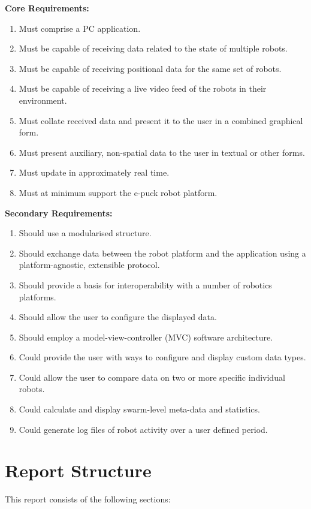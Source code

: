 \noindent\textbf{Core Requirements:}
\begin{enumerate}
	\item Must comprise a PC application.
	\item Must be capable of receiving data related to the state of multiple robots.
	\item Must be capable of receiving positional data for the same set of robots.
	\item Must be capable of receiving a live video feed of the robots in their environment.
	\item Must collate received data and present it to the user in a combined graphical form.
	\item Must present auxiliary, non-spatial data to the user in textual or other forms.
	\item Must update in approximately real time.
	\item Must at minimum support the e-puck robot platform.
\end{enumerate}

\noindent\textbf{Secondary Requirements:}
\begin{enumerate}
	\item Should use a modularised structure.
	\item Should exchange data between the robot platform and the application using a platform-agnostic, extensible protocol.
	\item Should provide a basis for interoperability with a number of robotics platforms.
	\item Should allow the user to configure the displayed data.
	\item Should employ a model-view-controller (MVC) software architecture.
	\item Could provide the user with ways to configure and display custom data types.
	\item Could allow the user to compare data on two or more specific individual robots.
	\item Could calculate and display swarm-level meta-data and statistics.
	\item Could generate log files of robot activity over a user defined period.
\end{enumerate}


\section{Report Structure}
This report consists of the following sections:

